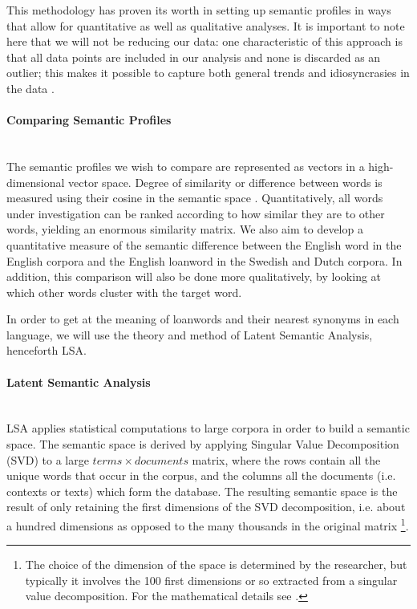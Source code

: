 \documentclass[a4paper]{article}
\begin{document}
This methodology has proven its worth in setting up semantic profiles in ways that allow for quantitative as well as qualitative analyses.
It is important to note here that we will not be reducing our data: one characteristic of this approach is that all data points are included in our analysis and none is discarded as an outlier; this makes it possible to capture both general trends and idiosyncrasies in the data  \citep[cf. also][p.678]{Bernardini2002,Walchli2012}.


\paragraph{Comparing Semantic Profiles} \hspace{0pt} \\
The semantic profiles we wish to compare are represented as vectors in a high-dimensional vector space. 
Degree of similarity or difference between words is measured using their cosine in the semantic space \citep{Deerwester1990}.
Quantitatively, all words under investigation can be ranked according to how similar they are to other words, yielding an enormous similarity matrix.
We also aim to develop a quantitative measure of the semantic difference between the English word in the English corpora and the English loanword in the Swedish and Dutch corpora. 
In addition, this comparison will also be done more qualitatively, by looking at which other words cluster with the target word. 

In order to get at the meaning of loanwords and their nearest synonyms in each language, we will use the theory and method of Latent Semantic Analysis, henceforth LSA.

\paragraph{Latent Semantic Analysis} \hspace{0pt} \\
LSA  \citep{Deerwester1990,Landauer1998,Dumais2004}  applies statistical computations to large corpora in order to build a semantic space.
The semantic space is derived by applying Singular Value Decomposition (SVD) to a large $ terms \times documents$ matrix, where the rows contain all the unique words that occur in the corpus, and the columns all the documents (i.e. contexts or texts) which form the database.
The resulting semantic space is the result of only retaining the first dimensions of the SVD decomposition, i.e. about a hundred dimensions as opposed to the many thousands in the original matrix%
\footnote{The choice of the dimension of the space is determined by the researcher, but typically it involves the 100 first dimensions or so extracted from a singular value decomposition. For the mathematical details see \citet{Deerwester1990}.}.
\end{document}
